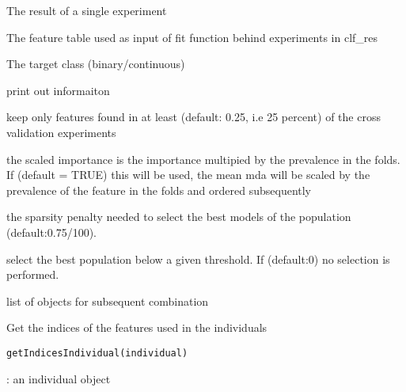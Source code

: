 \documentclass[a4paper]{book}
\begin{document}
\begin{Arguments}
\begin{ldescription}
\item[\code{clf\_res}] The result of a single experiment

\item[\code{X}] The feature table used as input of fit function behind experiments in clf\_res

\item[\code{y}] The target class (binary/continuous)

\item[\code{verbose}] print out informaiton

\item[\code{filter.cv.prev}] keep only features found in at least (default: 0.25, i.e 25 percent) of the cross validation experiments

\item[\code{scaled.importance}] the scaled importance is the importance multipied by the prevalence in the folds. If (default = TRUE) this will be used, the mean mda 
will be scaled by the prevalence of the feature in the folds and ordered subsequently

\item[\code{k\_penalty}] the sparsity penalty needed to select the best models of the population (default:0.75/100).

\item[\code{k\_max}] select the best population below a given threshold. If (default:0) no selection is performed.
\end{ldescription}
\end{Arguments}
%
\begin{Value}
list of objects for subsequent combination
\end{Value}
%
\begin{Description}
Get the indices of the features used in the individuals
\end{Description}
%
\begin{Usage}
\begin{verbatim}
getIndicesIndividual(individual)
\end{verbatim}
\end{Usage}
%
\begin{Arguments}
\begin{ldescription}
\item[\code{individual}] : an individual object
\end{ldescription}
\end{Arguments}
\end{document}
